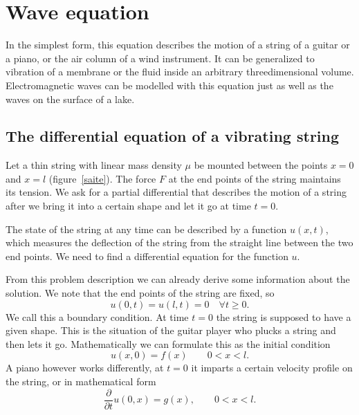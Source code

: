 %
%
%
\section{Wave equation\label{beispiele:wellengleichung}}
In the simplest form, this equation describes the motion
of a string of a guitar or a piano, or the air column of a 
wind instrument.
It can be generalized to vibration of a membrane or the fluid inside
an arbitrary threedimensional volume.
Electromagnetic waves can be modelled with this equation just as
well as the waves on the surface of a lake.

\subsection{The differential equation of a vibrating string}
Let a thin string with linear mass density $\mu$ be mounted between
the points $x=0$ and $x=l$ (figure~\ref{saite}).
The force $F$ at the end points of the string maintains its tension.
We ask for a partial differential that describes the motion of a
string after we bring it into a certain shape and let it go at time $t=0$.

The state of the string at any time can be described by a function
$u(x,t)$, which measures the deflection of the string from the straight
line between the two end points.
We need to find a differential equation for the function $u$.

From this problem description we can already derive some information
about the solution.
We note that the end points of the string are fixed, so
\[
u(0,t)=u(l,t)=0\quad\forall t\ge 0.
\]
We call this a boundary condition.
At time $t=0$ the string is supposed to have a given shape.
This is the situation of the guitar player who plucks a string and then
lets it go.
Mathematically we can formulate this as the initial condition
\[
u(x,0) = f(x)\qquad 0 < x < l.
\]
A piano however works differently, at $t=0$ it imparts a certain velocity
profile on the string, or in mathematical form
\[
\frac{\partial}{\partial t}u(0,x) = g(x),\qquad 0<x<l.
\]

